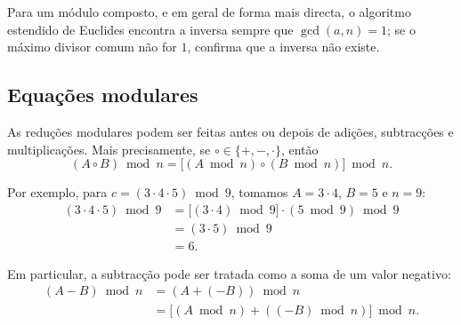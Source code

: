 \fi

Para um módulo composto, e em geral de forma mais directa, o algoritmo
estendido de Euclides \cite{extended-euclidean} encontra a inversa sempre que
\(\gcd(a,n)=1\); se o máximo divisor comum não for \(1\), confirma que a
inversa não existe.


\subsection{Equações modulares}
\label{subsec:modular-equations}

As reduções modulares podem ser feitas antes ou depois de adições,
subtracções e multiplicações. Mais precisamente, se
\(\circ\in\{+,-,\cdot\}\), então
\[
(A\circ B)\bmod n
=\bigl[(A\bmod n)\circ(B\bmod n)\bigr]\bmod n.
\]

Por exemplo, para \(c=(3\cdot4\cdot5)\bmod9\), tomamos
\(A=3\cdot4\), \(B=5\) e \(n=9\):
\begin{align*}
(3\cdot4\cdot5)\bmod9
    &=\bigl[(3\cdot4)\bmod9\bigr]\cdot(5\bmod9)\bmod9\\
    &=(3\cdot5)\bmod9\\
    &=6.
\end{align*}

Em particular, a subtracção pode ser tratada como a soma de um valor negativo:
\begin{align*}
(A-B)\bmod n
    &=(A+(-B))\bmod n\\
    &=\bigl[(A\bmod n)+((-B)\bmod n)\bigr]\bmod n.
\end{align*}

